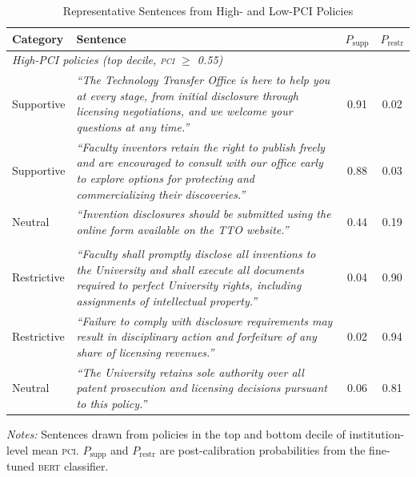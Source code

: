 \documentclass[12pt]{article}
\newcommand{\PCI}{\textsc{pci}}
\newcommand{\BERT}{\textsc{bert}}
\begin{document}
\begin{table}[H]
\centering
\caption{Representative Sentences from High- and Low-PCI Policies}
\label{tab:examples}
\begin{threeparttable}
\small
\begin{tabularx}{\textwidth}{lXcc}
\toprule
\textbf{Category} & \textbf{Sentence} & \textbf{$P_\text{supp}$} & \textbf{$P_\text{restr}$} \\
\midrule
\multicolumn{4}{l}{\textit{High-PCI policies (top decile, \PCI{} $\geq$ 0.55)}} \\
\addlinespace
Supportive & \textit{``The Technology Transfer Office is here to help you at every
  stage, from initial disclosure through licensing negotiations, and we welcome your
  questions at any time.''} & 0.91 & 0.02 \\
\addlinespace
Supportive & \textit{``Faculty inventors retain the right to publish freely and are
  encouraged to consult with our office early to explore options for protecting and
  commercializing their discoveries.''} & 0.88 & 0.03 \\
\addlinespace
Neutral & \textit{``Invention disclosures should be submitted using the online form
  available on the TTO website.''} & 0.44 & 0.19 \\
\addlinespace
\multicolumn{4}{l}{\textit{Low-PCI policies (bottom decile, \PCI{} $\leq$ 0.37)}} \\
\addlinespace
Restrictive & \textit{``Faculty shall promptly disclose all inventions to the
  University and shall execute all documents required to perfect University rights,
  including assignments of intellectual property.''} & 0.04 & 0.90 \\
\addlinespace
Restrictive & \textit{``Failure to comply with disclosure requirements may result
  in disciplinary action and forfeiture of any share of licensing revenues.''} & 0.02 & 0.94 \\
\addlinespace
Neutral & \textit{``The University retains sole authority over all patent prosecution
  and licensing decisions pursuant to this policy.''} & 0.06 & 0.81 \\
\bottomrule
\end{tabularx}
\begin{tablenotes}
\small
\item \textit{Notes:} Sentences drawn from policies in the top and bottom decile of
  institution-level mean \PCI.  $P_\text{supp}$ and $P_\text{restr}$ are
  post-calibration probabilities from the fine-tuned \BERT{} classifier.
\end{tablenotes}
\end{threeparttable}
\end{table}
\end{document}

